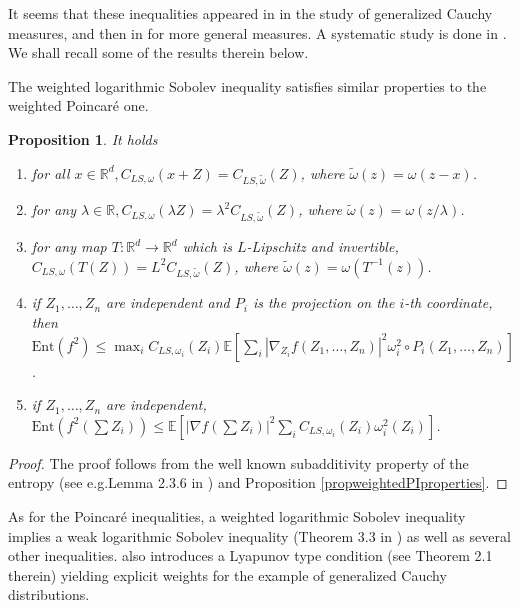 \documentclass[11pt,reqno]{amsart}
\numberwithin{equation}{section}
\newtheorem{proposition}[theorem]{Proposition}
\theoremstyle{definition}
\theoremstyle{remark}
\def \Ent {\textrm{Ent}}
\begin{document}
It seems that these inequalities appeared in \cite{BLweight} in the study of generalized Cauchy measures, and then in \cite{BLweight2} for more general measures. A systematic study is done in \cite{CGWu}. We shall recall some of the results therein below.


The weighted logarithmic Sobolev inequality satisfies similar properties to the weighted Poincar\'e one.
\begin{proposition}\label{propweightedLSIproperties}
    It holds
    \begin{enumerate}
        \item[(1)] for all $x\in\mathbb{R}^d, C_{LS,\omega}(x+Z) = C_{LS,\tilde\omega}(Z)$, where $\tilde \omega(z) = \omega(z-x)$.
        \item[(2)] for any $\lambda\in\mathbb{R}, C_{LS,\omega}(\lambda Z) = \lambda^2C_{LS,\tilde\omega}(Z)$, where $\tilde \omega(z) = \omega(z/\lambda)$.
        \item [(3)] for any map $T:\mathbb{R}^d\to\mathbb{R}^d$ which is $L$-Lipschitz and invertible, $C_{LS,\omega}(T(Z)) = L^2C_{LS,\tilde\omega}(Z)$, where $\tilde \omega(z) = \omega(T^{-1}(z))$.
        \item[(4)] if $Z_1, \dots, Z_n$ are independent and $P_i$ is the projection on the $i$-th coordinate, then $\Ent\left(f^2\right)\leq \max_iC_{LS,\omega_i}(Z_i)\mathbb{E}\left[\sum_i\left\vert \nabla_{Z_i} f\left( Z_1,\dots, Z_n\right)\right\vert^2\omega_i^2\circ P_i(Z_1, \dots, Z_n)\right]$.
        \item[(5)] if $Z_1, \dots, Z_n$ are independent, $\Ent\left(f^2\left(\sum Z_i\right)\right)\leq\mathbb{E}\left[\left\vert \nabla f\left(\sum Z_i\right)\right\vert^2\sum_{i} C_{LS, \omega_i}(Z_i)\omega_i^2(Z_i)\right]$.
    \end{enumerate}
\end{proposition}

\begin{proof}
    The proof follows from the well known subadditivity property of the entropy (see e.g.Lemma 2.3.6 in \cite{Chewi}) and  Proposition \ref{propweightedPIproperties}.
\end{proof}

As for the Poincar\'e inequalities, a weighted logarithmic Sobolev inequality implies a weak logarithmic Sobolev inequality (Theorem 3.3 in \cite{CGWu}) as well as several other inequalities. \cite{CGWu} also introduces a Lyapunov type condition (see Theorem 2.1 therein) yielding explicit weights for the example of generalized Cauchy distributions.
\end{document}
